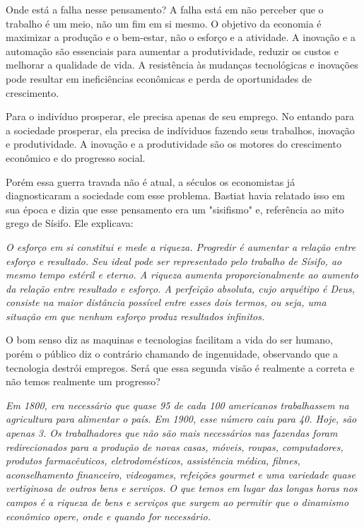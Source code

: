 Onde está a falha nesse pensamento? A falha está em não perceber que o trabalho é um meio, não um fim em si mesmo. O objetivo da economia é maximizar a produção e o bem-estar, não o esforço e a atividade. A inovação e a automação são essenciais para aumentar a produtividade, reduzir os custos e melhorar a qualidade de vida. A resistência às mudanças tecnológicas e inovações pode resultar em ineficiências econômicas e perda de oportunidades de crescimento.

Para o indivíduo prosperar, ele precisa apenas de seu emprego. No entando para a sociedade prosperar, ela precisa de indíviduos fazendo seus trabalhos, inovação e produtividade. A inovação e a produtividade são os motores do crescimento econômico e do progresso social. 

Porém essa guerra travada não é atual, a séculos os economistas já diagnosticaram a sociedade com esse problema. Bastiat havia relatado isso em sua época e dizia que esse pensamento era um "sisifismo" e, referência ao mito grego de Sísifo. Ele explicava:

\begin{citacao}
    \textit{
        O esforço em si constitui e mede a riqueza. Progredir é aumentar a relação entre esforço e resultado. Seu ideal pode ser representado pelo trabalho de Sísifo, ao mesmo tempo estéril e eterno. \newline
        A riqueza aumenta proporcionalmente ao aumento da relação entre resultado e esforço. A perfeição absoluta, cujo arquétipo é Deus, consiste na maior distância possível entre esses dois termos, ou seja, uma situação em que nenhum esforço produz resultados infinitos.
    } \newline
    \cite{bastiat1859sofismas}
\end{citacao}

O bom senso diz as maquinas e tecnologias facilitam a vida do ser humano, porém o público diz o contrário chamando de ingenuidade, observando que a tecnologia destrói empregos. Será que essa segunda visão é realmente a correta e não temos realmente um progresso?

\begin{citacao}
    \textit{
        Em 1800, era necessário que quase 95 de cada 100 americanos trabalhassem na agricultura para alimentar o país. Em 1900, esse número caiu para 40. Hoje, são apenas 3. Os trabalhadores que não são mais necessários nas fazendas foram redirecionados para a produção de novas casas, móveis, roupas, computadores, produtos farmacêuticos, eletrodomésticos, assistência médica, filmes, aconselhamento financeiro, videogames, refeições gourmet e uma variedade quase vertiginosa de outros bens e serviços. O que temos em lugar das longas horas nos campos é a riqueza de bens e serviços que surgem ao permitir que o dinamismo econômico opere, onde e quando for necessário.
    } \newline
    \cite{Myths-of-Rich-and-Poor}
\end{citacao}

